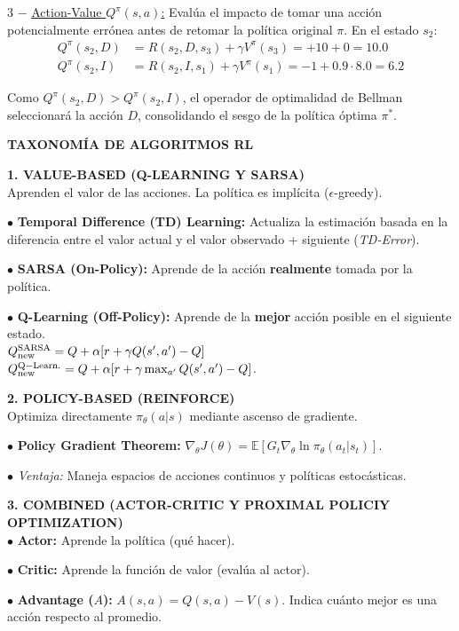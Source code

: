 \documentclass[8pt,a4paper,landscape,fleqn]{extarticle}
\begin{document}
\begin{multicols*}{3}
$-$ \underline{Action-Value $Q^\pi(s, a)$:} Evalúa el impacto de tomar una acción potencialmente errónea antes de retomar la política original $\pi$. En el estado $s_2$:
\begin{align*}
    Q^\pi(s_2, D) &= R(s_2, D, s_3) + \gamma V^\pi(s_3) = +10 + 0 = 10.0 \\
    Q^\pi(s_2, I) &= R(s_2, I, s_1) + \gamma V^\pi(s_1) = -1 + 0.9 \cdot 8.0 = 6.2
\end{align*}

Como $Q^\pi(s_2, D) > Q^\pi(s_2, I)$, el operador de optimalidad de Bellman seleccionará la acción $D$, consolidando el sesgo de la política óptima $\pi^*$.


\textbf{TAXONOMÍA DE ALGORITMOS RL}

\textbf{1. VALUE-BASED (Q-LEARNING Y SARSA)}\\
Aprenden el valor de las acciones. La política es implícita ($\epsilon$-greedy).

$\bullet$ \textbf{Temporal Difference (TD) Learning:} Actualiza la estimación basada en la diferencia entre el valor actual y el valor observado + siguiente (\textit{TD-Error}).

$\bullet$ \textbf{SARSA (On-Policy):} Aprende de la acción \textbf{realmente} tomada por la política.

$\bullet$ \textbf{Q-Learning (Off-Policy):} Aprende de la \textbf{mejor} acción posible en el siguiente estado. \\
$Q^{\rm SARSA}_{\rm new} = Q + \alpha [r + \gamma Q(s', a') - Q]$ \quad $Q^{\rm Q-Learn.}_{\rm new} = Q + \alpha [r + \gamma \max_{a'} Q(s', a') - Q]$.

\textbf{2. POLICY-BASED (REINFORCE)}\\
Optimiza directamente $\pi_\theta(a|s)$ mediante ascenso de gradiente.

$\bullet$ \textbf{Policy Gradient Theorem:} $\nabla_\theta J(\theta) = \mathbb{E} [G_t \nabla_\theta \ln \pi_\theta(a_t|s_t)]$.

$\bullet$ \textit{Ventaja:} Maneja espacios de acciones continuos y políticas estocásticas.

\textbf{3. COMBINED (ACTOR-CRITIC Y PROXIMAL POLICIY OPTIMIZATION)}\\
$\bullet$ \textbf{Actor:} Aprende la política (qué hacer).

$\bullet$ \textbf{Critic:} Aprende la función de valor (evalúa al actor).

$\bullet$ \textbf{Advantage ($A$):} $A(s, a) = Q(s, a) - V(s)$. Indica cuánto mejor es una acción respecto al promedio.


\end{multicols*}
\end{document}
